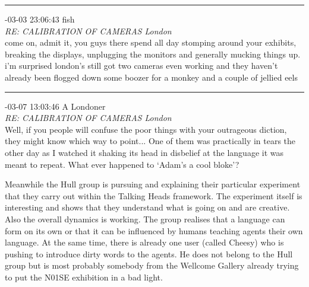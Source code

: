 \begin{mail}
\rule{0.8\textwidth}{.4pt}

{-03-03 23:06:43 fish}\\
{\itshape RE: CALIBRATION OF CAMERAS London}\\
come on, admit it, you guys there spend all day stomping around your exhibits, breaking the displays, unplugging the monitors and generally mucking things up. i'm surprised london's still got two cameras even working and they haven't already been flogged down some boozer for a monkey and a couple of jellied eels\\

\rule{0.8\textwidth}{.4pt}

{-03-07 13:03:46 A Londoner}\\
{\itshape RE: CALIBRATION OF CAMERAS London}\\
Well, if you people will confuse the poor things with your outrageous diction, they might know which way to point... One of them was practically in tears the other day as I watched it shaking its head in disbelief at the language it was meant to repeat. What ever happened to `Adam's a cool bloke'?
\end{mail}

Meanwhile the Hull group is pursuing and explaining their particular experiment that they carry out within the 
Talking Heads framework. The experiment itself is interesting and shows that they understand what is 
going on and are creative. Also the overall dynamics is working. The group realises that a language can form 
on its own or that it can be influenced by humans teaching agents their own language. 
At the same time, there is already one user (called Cheesy) who is pushing to introduce
dirty words to the agents. He does not belong to the Hull group but is most probably somebody from the 
Wellcome Gallery already trying to put the N01SE exhibition in a bad light. \\

